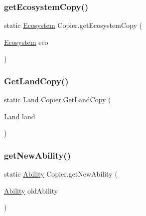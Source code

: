 \mbox{\label{class_copier_a19904060ea391728436f2f36ddf36a73}} 
\subsubsection{\texorpdfstring{get\+Ecosystem\+Copy()}{getEcosystemCopy()}}
{\footnotesize\ttfamily static \mbox{\hyperlink{class_ecosystem}{Ecosystem}} Copier.\+get\+Ecosystem\+Copy (\begin{DoxyParamCaption}\item[{\mbox{\hyperlink{class_ecosystem}{Ecosystem}}}]{eco }\end{DoxyParamCaption})\hspace{0.3cm}{\ttfamily [static]}}

\mbox{\label{class_copier_ac38173e26db80dad92a6ca9cd083f058}} 
\subsubsection{\texorpdfstring{Get\+Land\+Copy()}{GetLandCopy()}}
{\footnotesize\ttfamily static \mbox{\hyperlink{class_land}{Land}} Copier.\+Get\+Land\+Copy (\begin{DoxyParamCaption}\item[{\mbox{\hyperlink{class_land}{Land}}}]{land }\end{DoxyParamCaption})\hspace{0.3cm}{\ttfamily [static]}}

\mbox{\label{class_copier_a0912151eec03dadf8d375bde174522aa}} 
\subsubsection{\texorpdfstring{get\+New\+Ability()}{getNewAbility()}}
{\footnotesize\ttfamily static \mbox{\hyperlink{class_ability}{Ability}} Copier.\+get\+New\+Ability (\begin{DoxyParamCaption}\item[{\mbox{\hyperlink{class_ability}{Ability}}}]{old\+Ability }\end{DoxyParamCaption})\hspace{0.3cm}{\ttfamily [static]}}

